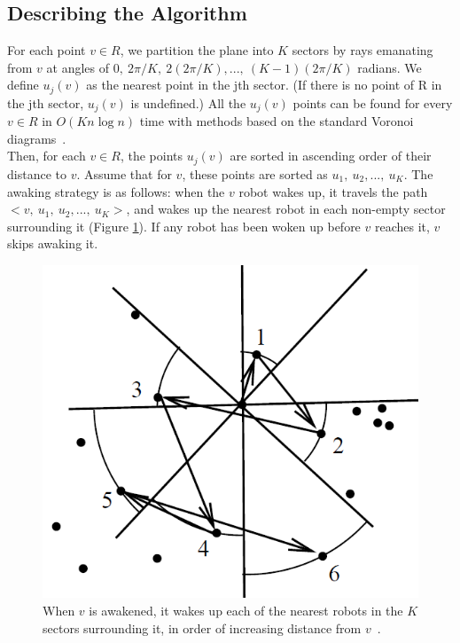 \documentclass{cccg12}
\begin{document}
\subsection{Describing the Algorithm}
For each point ${ v \in R }$, we partition the plane into $K$ sectors by rays emanating from $v$ at angles of
${ 0, ~2\pi/K, ~2(2\pi/K), ..., ~(K-1)(2\pi/K) }$
radians. We define $u_j(v)$ as the nearest point in the jth sector. (If there is no point of R in the jth sector, $u_j(v)$ is undefined.) All the $u_j(v)$ points can be found for every ${ v \in R }$ in ${ O(Kn\log n) }$ time with methods based on the standard Voronoi diagrams~\cite{Clarkson1987}.\\
Then, for each ${ v \in R }$, the points $u_j(v)$ are sorted in ascending order of their distance to $v$. Assume that for $v$, these points are sorted as ${ u_1,~u_2,...,~u_K }$. The awaking strategy is as follows: when the $v$ robot wakes up, it travels the path ${ <v,~u_1,~u_2,...,~u_K> }$, and wakes up the nearest robot in each non-empty sector surrounding it (Figure \ref{fig:thetagraph}). If any robot has been woken up before $v$ reaches it, $v$ skips awaking it.
\begin{figure} [h]
  \centering
  \includegraphics[scale=.5]{Figs/fig2.png}
  \caption{When $v$ is awakened, it wakes up each of the nearest robots in the $K$ sectors surrounding it, in order of increasing distance from $v$~\cite{Arkin2006}.}
  \label{fig:thetagraph}
\end{figure}
\end{document}
